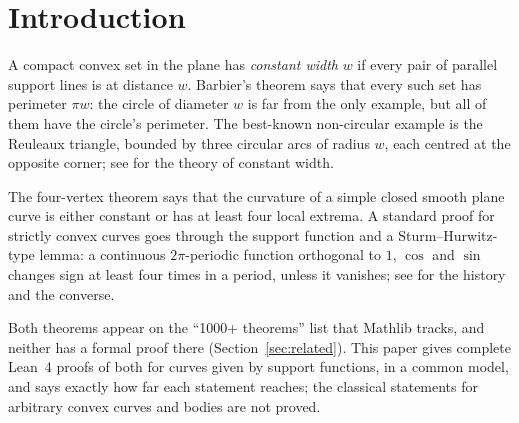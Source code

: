 \documentclass[11pt]{article}
\theoremstyle{definition}
\theoremstyle{remark}
\begin{document}
\section{Introduction}

A compact convex set in the plane has \emph{constant width} $w$ if every pair of parallel support
lines is at distance $w$. Barbier's theorem \cite{barbier1860} says that every such set has perimeter $\pi w$:
the circle of diameter $w$ is far from the only example, but all of them have the circle's
perimeter. The best-known non-circular example is the Reuleaux triangle, bounded by three circular
arcs of radius $w$, each centred at the opposite corner; see \cite{martini2019} for the theory of
constant width.

The four-vertex theorem \cite{mukhopadhyaya1909,kneser1912} says that the
curvature of a simple closed smooth plane curve is either constant or has at least four local
extrema. A standard proof for strictly convex curves goes through the support function and a
Sturm--Hurwitz-type lemma: a continuous $2\pi$-periodic function orthogonal to $1$, $\cos$ and $\sin$
changes sign at least four times in a period, unless it vanishes; see \cite{osserman1985,gluck1971,deturck2007} for the history and the converse.

Both theorems appear on the ``1000+ theorems'' list that Mathlib tracks, and neither has a formal
proof there (Section~\ref{sec:related}). This paper gives complete Lean~4 proofs of both for curves given by
support functions, in a common model, and says exactly how far each statement reaches; the
classical statements for arbitrary convex curves and bodies are not proved.
\end{document}
